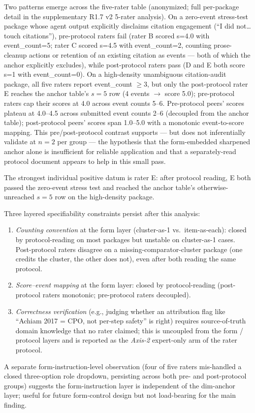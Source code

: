 Two patterns emerge across the five-rater table (anonymized; full per-package detail in the supplementary R1.7 v2 5-rater analysis). On a zero-event stress-test package whose agent output explicitly disclaims citation engagement (``I did not\dots touch citations''), pre-protocol raters fail (rater B scored s=4.0 with event\_count=5; rater C scored s=4.5 with event\_count=2, counting prose-cleanup actions or retention of an existing citation as events --- both of which the anchor explicitly excludes), while post-protocol raters pass (D and E both score s=1 with event\_count=0). On a high-density unambiguous citation-audit package, all five raters report event\_count $\geq 3$, but only the post-protocol rater E reaches the anchor table's $s=5$ row (4 events $\to$ score 5.0); pre-protocol raters cap their scores at 4.0 across event counts 5--6. Pre-protocol peers' scores plateau at 4.0--4.5 across submitted event counts 2--6 (decoupled from the anchor table); post-protocol peers' scores span 1.0--5.0 with a monotonic event-to-score mapping. This pre/post-protocol contrast supports --- but does not inferentially validate at $n = 2$ per group --- the hypothesis that the form-embedded sharpened anchor alone is insufficient for reliable application and that a separately-read protocol document appears to help in this small pass.

The strongest individual positive datum is rater E: after protocol reading, E both passed the zero-event stress test and reached the anchor table's otherwise-unreached $s = 5$ row on the high-density package.

Three layered specifiability constraints persist after this analysis:
\begin{enumerate}
    \item \emph{Counting convention} at the form layer (cluster-as-1 vs.\ item-as-each): closed by protocol-reading on most packages but unstable on cluster-as-1 cases. Post-protocol raters disagree on a missing-comparator-cluster package (one credits the cluster, the other does not), even after both reading the same protocol.
    \item \emph{Score--event mapping} at the form layer: closed by protocol-reading (post-protocol raters monotonic; pre-protocol raters decoupled).
    \item \emph{Correctness verification} (e.g., judging whether an attribution flag like ``Achiam 2017 = CPO, not per-step safety'' is right) requires source-of-truth domain knowledge that no rater claimed; this is uncoupled from the form / protocol layers and is reported as the \emph{Axis-2} expert-only arm of the rater protocol.
\end{enumerate}
A separate form-instruction-level observation (four of five raters mis-handled a closed three-option role dropdown, persisting across both pre- and post-protocol groups) suggests the form-instruction layer is independent of the dim-anchor layer; useful for future form-control design but not load-bearing for the main finding.

